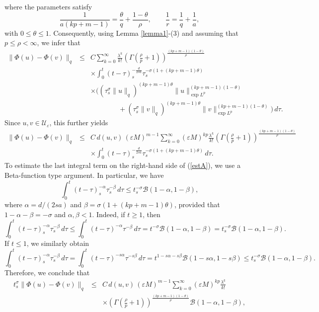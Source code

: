 \documentclass[a4paper,11pt]{amsart}
\renewcommand\eqref[1]{(\ref{#1})} %
\numberwithin{equation}{section}
\theoremstyle{plain}
\theoremstyle{definition}
\begin{document}
where the parameters satisfy
\[
\frac{1}{a(kp+m-1)}
=
\frac{\theta}{q}
+
\frac{1-\theta}{\rho},\qquad \frac{1}{r}
=
\frac{1}{q}
+
\frac{1}{a},
\]
with $0\leq \theta\leq 1$. Consequently, using Lemma \ref{lemma1}-(3) and assuming that $p\leq \rho<\infty$, we infer that
\begin{eqnarray*}
\|\Phi(u)-\Phi(v)\|_{q}
&\leq&
C\sum_{k=0}^{\infty}\frac{\lambda^k}{k!}
\left(\Gamma\!\left(\frac{\rho}{p}+1\right)\right)^{\frac{(kp+m-1)(1-\theta)}{\rho}}
\\
&&\times
\int_0^t
(t-\tau)_s^{-\frac{d}{2 sa}}
\tau_s^{-\sigma(1+(kp+m-1)\theta)}
\\
&&\times
\Big(
(\tau_s^\sigma\|u\|_{q})^{(kp+m-1)\theta}
\|u\|_{\exp L^p}^{(kp+m-1)(1-\theta)}
\\
&&\qquad\qquad
+
(\tau_s^\sigma\|v\|_{q})^{(kp+m-1)\theta}
\|v\|_{\exp L^p}^{(kp+m-1)(1-\theta)}
\Big)
\,d\tau.
\end{eqnarray*}
Since $u,v\in \mathcal{U}_\varepsilon$, this further yields
\begin{eqnarray}\label{estA}
\|\Phi(u)-\Phi(v)\|_{q}&\leq&
C\, d(u,v)\, (\varepsilon M)^{m-1}
\sum_{k=0}^{\infty}
(\varepsilon M)^{kp}
\frac{\lambda^k}{k!}\left(\Gamma\!\left(\frac{\rho}{p}+1\right)\right)^{\frac{(kp+m-1)(1-\theta)}{\rho}}\nonumber
\\
&&\times \int_0^t
(t-\tau)_s^{-\frac{d}{2 sa}}
\tau_s^{-\sigma(1+(kp+m-1)\theta)}
\,d\tau.
\end{eqnarray}
To estimate the last integral term on the right-hand side of \eqref{estA}, we use a Beta-function type argument. In particular, we have
$$
\int_0^t
(t-\tau)_s^{-\alpha}
\tau_s^{-\beta}
\,d\tau
\leq
t_s^{-\sigma}
\mathcal{B}(1-\alpha,1-\beta),
$$
where $\alpha=d/(2sa)$ and $\beta=\sigma(1+(kp+m-1)\theta)$, provided that
$1-\alpha-\beta=-\sigma$ and $\alpha,\beta<1$.
Indeed, if $t\geq1$, then
$$\int_0^t
(t-\tau)_s^{-\alpha}
\tau_s^{-\beta}
\,d\tau
\leq\int_0^t
(t-\tau)^{-\alpha}
\tau^{-\beta}
\,d\tau=
t^{-\sigma}
\mathcal{B}(1-\alpha,1-\beta)=t_s^{-\sigma}
\mathcal{B}(1-\alpha,1-\beta).
$$
If $t\leq 1$, we similarly obtain
$$\int_0^t
(t-\tau)_s^{-\alpha}
\tau_s^{-\beta}
\,d\tau
=\int_0^t
(t-\tau)^{-s\alpha}
\tau^{-s\beta}
\,d\tau=
t^{1-s\alpha-s\beta}
\mathcal{B}(1-s\alpha,1-s\beta)\leq t_s^{-\sigma}
\mathcal{B}(1-\alpha,1-\beta).
$$
Therefore, we conclude that
\begin{eqnarray*}
t_s^\sigma
\|\Phi(u)-\Phi(v)\|_{q}
&\leq&
C\, d(u,v)\, (\varepsilon M)^{m-1}
\sum_{k=0}^{\infty}
(\varepsilon M)^{kp}
\frac{\lambda^k}{k!}
\\
&&\times
\left(\Gamma\!\left(\frac{\rho}{p}+1\right)\right)^{\frac{(kp+m-1)(1-\theta)}{\rho}}\mathcal{B}(1-\alpha,1-\beta),
\end{eqnarray*}
\end{document}
